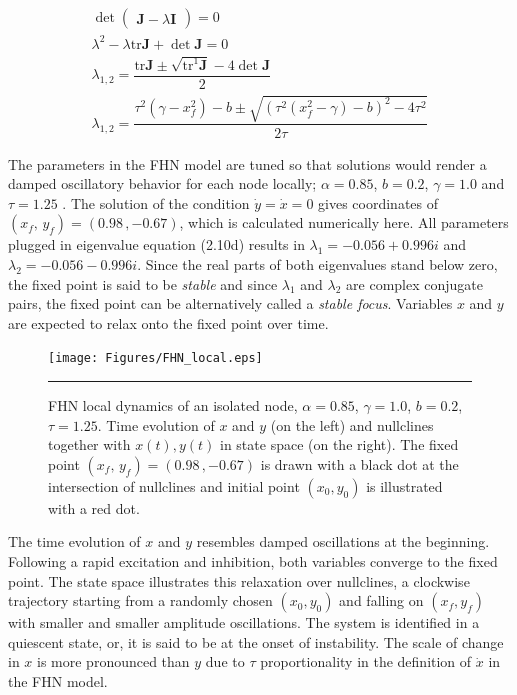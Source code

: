 \begin{subequations}
\begin{align} \det \begin{pmatrix} \textbf{J} - \lambda \textbf{I} \end{pmatrix} = 0
              \label{eqn: frobenius 8}\\  
 \lambda^2 - \lambda \mathrm{tr} \textbf{J} + \det \textbf{J} = 0
               \label{eqn: frobenius 9} \\
\lambda_{1,2} = \dfrac{\mathrm{tr} \textbf{J} \pm \sqrt{\mathrm{tr} ^1 \textbf{J}} -4 \det \textbf{J} }{2}               
                \label{eqn: frobenius 10} \\    
\lambda_{1,2} = \dfrac{\tau^2(\gamma - x_f^2)-b \pm \sqrt{(\tau^2(x_f^2-\gamma)-b)^2 - 4 \tau^2 }}{2 \tau}
               \label{eqn: frobenius 11}                 
               \end{align} 
\end{subequations}

The parameters in the FHN model are tuned so that solutions would render a damped oscillatory behavior for each node locally;  $\alpha = 0.85$, $b=0.2$, $\gamma=1.0$ and $\tau=1.25$ \citep{VUK13}. The solution of the condition $\dot{y}=\dot{x}=0$ gives coordinates of $(x_f, \, y_f) = (0.98 \, , -0.67 )$, which is calculated numerically here. All parameters plugged in eigenvalue equation (2.10d) results in $\lambda_1 = -0.056 + 0.996 i$ and $\lambda_2 = -0.056 - 0.996 i$. Since the real parts of both eigenvalues stand below zero, the fixed point is said to be \textit{stable} and since $\lambda_1$ and $\lambda_2$ are complex conjugate pairs, the fixed point can be alternatively called a \textit{stable focus}. Variables $x$ and $y$ are expected to relax onto the fixed point over time.  

\begin{figure}[htbp]
  \centering
	\texttt{[image: Figures/FHN\_local.eps]}
 
    \rule{35em}{0.5pt}
    \caption[FHN Local]{FHN local dynamics of an isolated node, $\alpha=0.85$, $\gamma=1.0$, $b=0.2$, $\tau=1.25$. Time evolution of $x$ and  $y$ (on the left) and nullclines together with $x(t),y(t)$ in state space (on the right). The fixed point $(x_f, \, y_f) = (0.98 \, , -0.67 )$ is drawn with a black dot at the intersection of nullclines and initial point $(x_0, y_0)$ is illustrated with a red dot.  }
  \label{fig:FHN Local}	
\end{figure}

The time evolution of $x$ and $y$ resembles damped oscillations at the beginning. Following a rapid excitation and inhibition, both variables converge to the fixed point. The state space illustrates this relaxation over nullclines, a clockwise trajectory starting from a randomly chosen $(x_0, y_0)$ and falling on $(x_f, y_f)$ with smaller and smaller amplitude oscillations. The system is identified in a  quiescent state, or, it is said to be at the onset of instability. The scale of change in $x$  is more pronounced than $y$ due to $\tau$ proportionality in the definition of $\dot{x}$ in the FHN model.  
 
